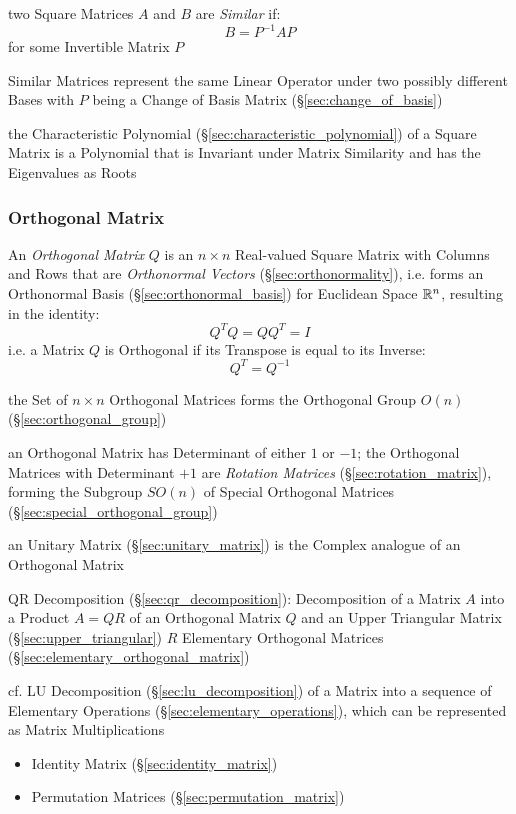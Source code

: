 two Square Matrices $A$ and $B$ are \emph{Similar} if:
\[
  B = P^{-1}AP
\]
for some Invertible Matrix $P$

Similar Matrices represent the same Linear Operator under two possibly
different Bases with $P$ being a Change of Basis Matrix
(\S\ref{sec:change_of_basis})

the Characteristic Polynomial (\S\ref{sec:characteristic_polynomial}) of a
Square Matrix is a Polynomial that is Invariant under Matrix Similarity and has
the Eigenvalues as Roots



\subsubsection{Orthogonal Matrix}\label{sec:orthogonal_matrix}

An \emph{Orthogonal Matrix} $Q$ is an $n \times n $ Real-valued Square Matrix
with Columns and Rows that are \emph{Orthonormal Vectors}
(\S\ref{sec:orthonormality}), i.e. forms an Orthonormal Basis
(\S\ref{sec:orthonormal_basis}) for Euclidean Space $\mathbb{R}^n$, resulting in
the identity:
\[
  Q^TQ = QQ^T = I
\]
i.e. a Matrix $Q$ is Orthogonal if its Transpose is equal to its Inverse:
\[
  Q^T = Q^{-1}
\]

the Set of $n \times n$ Orthogonal Matrices forms the Orthogonal Group
$O(n)$ (\S\ref{sec:orthogonal_group})

an Orthogonal Matrix has Determinant of either $1$ or $-1$; the Orthogonal
Matrices with Determinant $+1$ are \emph{Rotation Matrices}
(\S\ref{sec:rotation_matrix}), forming the Subgroup $SO(n)$ of Special
Orthogonal Matrices (\S\ref{sec:special_orthogonal_group})

\fist an Unitary Matrix (\S\ref{sec:unitary_matrix}) is the Complex analogue of
an Orthogonal Matrix

QR Decomposition (\S\ref{sec:qr_decomposition}): Decomposition of a Matrix $A$
into a Product $A = QR$ of an Orthogonal Matrix $Q$ and an Upper Triangular
Matrix (\S\ref{sec:upper_triangular}) $R$ \fist Elementary Orthogonal Matrices
(\S\ref{sec:elementary_orthogonal_matrix})

cf. LU Decomposition (\S\ref{sec:lu_decomposition}) of a Matrix into a sequence
of Elementary Operations (\S\ref{sec:elementary_operations}), which can be
represented as Matrix Multiplications

\begin{itemize}
  \item Identity Matrix (\S\ref{sec:identity_matrix})
  \item Permutation Matrices (\S\ref{sec:permutation_matrix})
\end{itemize}




